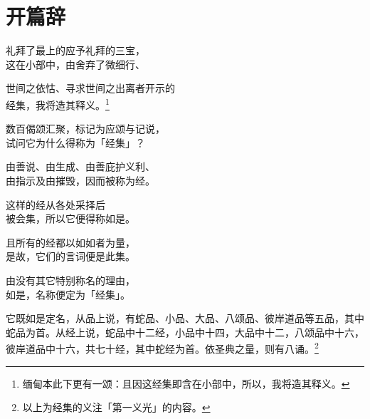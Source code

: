 \chapter{开篇辞}

\begin{quoting}礼拜了最上的应予礼拜的三宝，\\这在小部中，由舍弃了微细行、\end{quoting}

\begin{quoting}世间之依怙、寻求世间之出离者开示的\\经集，我将造其释义。\footnote{缅甸本此下更有一颂：且因这经集即含在小部中，所以，我将造其释义。}\end{quoting}

\begin{quoting}数百偈颂汇聚，标记为应颂与记说，\\试问它为什么得称为「经集」？\end{quoting}

\begin{quoting}由善说、由生成、由善庇护义利、\\由指示及由摧毁，因而被称为经。\end{quoting}

\begin{quoting}这样的经从各处采择后\\被会集，所以它便得称如是。\end{quoting}

\begin{quoting}且所有的经都以如如者为量，\\是故，它们的言词便是此集。\end{quoting}

\begin{quoting}由没有其它特别称名的理由，\\如是，名称便定为「经集」。\end{quoting}

它既如是定名，从品上说，有蛇品、小品、大品、八颂品、彼岸道品等五品，其中蛇品为首。从经上说，蛇品中十二经，小品中十四，大品中十二，八颂品中十六，彼岸道品中十六，共七十经，其中蛇经为首。依圣典之量，则有八诵。\footnote{以上为经集的义注「第一义光」的内容。}